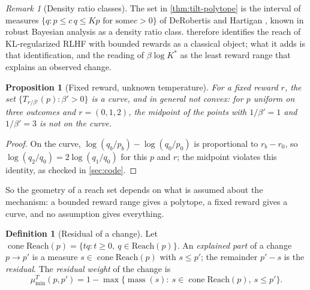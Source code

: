 \documentclass[11pt]{article}
\newtheorem{proposition}[theorem]{Proposition}
\theoremstyle{definition}
\newtheorem{definition}[theorem]{Definition}
\theoremstyle{remark}
\newtheorem{remark}[theorem]{Remark}
\newcommand{\Reach}{\mathrm{Reach}}
\newcommand{\cone}{\operatorname{cone}}
\newcommand{\mass}{\operatorname{mass}}
\begin{document}
\begin{remark}[Density ratio classes]\label{rem:drc}
The set in \cref{thm:tilt-polytope} is the interval of measures $\{q: p\le c\,q\le Kp\text{ for some
}c>0\}$ of DeRobertis and Hartigan \cite{DeRobertisHartigan1981}, known in robust Bayesian analysis as a
density ratio class.  therefore identifies the reach of KL-regularized RLHF
with bounded rewards as a classical object; what it adds is that identification, and the reading of
$\beta\log K^*$ as the least reward range that explains an observed change.
\end{remark}

\begin{proposition}[Fixed reward, unknown temperature]\label{prop:curve}
For a fixed reward $r$, the set $\{T_{r/\beta'}(p):\beta'>0\}$ is a curve, and in general not convex:
for $p$ uniform on three outcomes and $r=(0,1,2)$, the midpoint of the points with $1/\beta'=1$ and
$1/\beta'=3$ is not on the curve.
\end{proposition}
\begin{proof}
On the curve, $\log(q_b/p_b)-\log(q_0/p_0)$ is proportional to $r_b-r_0$, so $\log(q_2/q_0)=
2\log(q_1/q_0)$ for this $p$ and $r$; the midpoint violates this identity, as checked in
\cref{sec:code}.
\end{proof}

So the geometry of a reach set depends on what is assumed about the mechanism: a bounded reward range
gives a polytope, a fixed reward gives a curve, and no assumption gives everything.

\begin{definition}[Residual of a change]
Let $\cone\Reach(p)=\{tq:t\ge0,\ q\in\Reach(p)\}$. An \emph{explained part} of a change $p\to p'$ is a
measure $s\in\cone\Reach(p)$ with $s\le p'$; the remainder $p'-s$ is the \emph{residual}. The
\emph{residual weight} of the change is
\[
\mu^T_{\min}(p,p')=1-\max\{\mass(s):\ s\in\cone\Reach(p),\ s\le p'\}.
\]
\end{definition}
\end{document}
